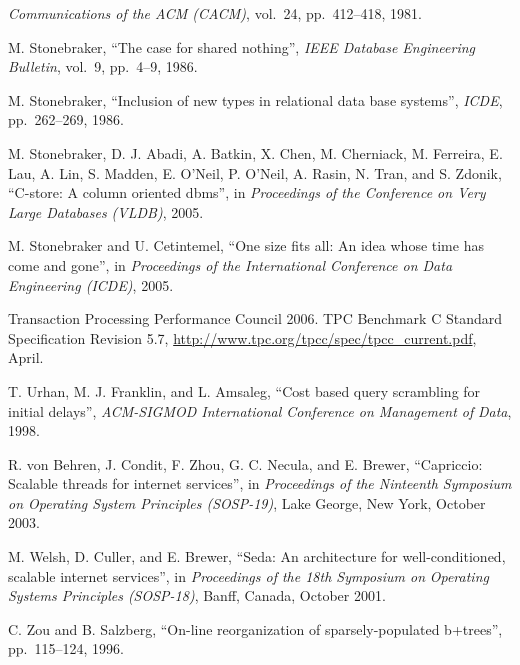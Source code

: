 \documentclass[a4paper,11pt,twoside,openright]{book}
\begin{document}
\begin{enumerate}[label={[\arabic*]}]
  \emph{Communications of the ACM (CACM)}, vol.~24, pp.~412--418, 1981.
\item
  M. Stonebraker, ``The case for shared nothing'', \emph{IEEE Database
  Engineering} \emph{Bulletin}, vol.~9, pp.~4--9, 1986.
\item
  M. Stonebraker, ``Inclusion of new types in relational data base
  systems'', \emph{ICDE}, pp.~262--269, 1986.
\item
  M. Stonebraker, D. J. Abadi, A. Batkin, X. Chen, M. Cherniack, M.
  Ferreira, E. Lau, A. Lin, S. Madden, E. O'Neil, P. O'Neil, A. Rasin,
  N. Tran, and S. Zdonik, ``C-store: A column oriented dbms'', in \emph{Proceedings
of the Conference on Very Large Databases (VLDB)}, 2005.
\item
  M. Stonebraker and U. Cetintemel, ``One size fits all: An idea whose
  time has come and gone'', in \emph{Proceedings of the International
  Conference on Data} \emph{Engineering (ICDE)}, 2005.
\item
  Transaction Processing Performance Council 2006. TPC Benchmark C
  Standard Specification Revision 5.7, \url{http://www.tpc.org/tpcc/spec/tpcc\_current.pdf}, April.
\item
  T. Urhan, M. J. Franklin, and L. Amsaleg, ``Cost based query
  scrambling for initial delays'', \emph{ACM-SIGMOD International
  Conference on Management of} \emph{Data}, 1998.
\item
  R. von Behren, J. Condit, F. Zhou, G. C. Necula, and E. Brewer,
  ``Capriccio: Scalable threads for internet services'', in
  \emph{Proceedings of the Ninteenth Symposium on Operating System
  Principles (SOSP-19)}, Lake George, New York, October 2003.
\item
  M. Welsh, D. Culler, and E. Brewer, ``Seda: An architecture for well-conditioned,
  scalable internet services'', in \emph{Proceedings of the
  18th Symposium on} \emph{Operating Systems Principles (SOSP-18)},
  Banff, Canada, October 2001.
\item
  C. Zou and B. Salzberg, ``On-line reorganization of sparsely-populated
  b+trees'', pp.~115--124, 1996.
\end{enumerate}
\end{document}
